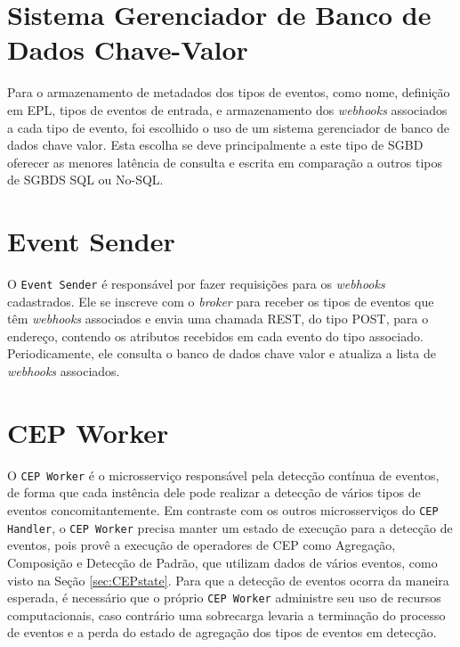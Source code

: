\section{Sistema Gerenciador de Banco de Dados Chave-Valor}
\label{sec:key-value-sgbd}
Para o armazenamento de metadados dos tipos de eventos, como nome, definição em EPL, tipos de eventos de entrada, e armazenamento dos \textit{webhooks} associados a cada tipo de evento, foi escolhido o uso de um sistema gerenciador de banco de dados chave valor. Esta escolha se deve principalmente a este tipo de SGBD oferecer as menores latência de consulta e escrita em comparação a outros tipos de SGBDS SQL ou No-SQL. 

\section{Event Sender} \label{sec:eventsender}

O \texttt{Event Sender} é responsável por fazer requisições para os \textit{webhooks} cadastrados. 
Ele se inscreve com o \textit{broker}%
para receber os tipos de eventos que têm \textit{webhooks} associados e envia uma chamada REST, do tipo POST, para o endereço, contendo os atributos recebidos em cada evento do tipo associado. Periodicamente, ele consulta o banco de dados chave valor e atualiza a lista de \textit{webhooks} associados.

\section{CEP Worker} \label{sec:cepworker}

O \texttt{CEP Worker} é o microsserviço responsável pela detecção contínua de eventos, de forma que cada instência dele pode realizar a detecção de vários tipos de eventos concomitantemente.
Em contraste com os outros microsserviços do \texttt{CEP Handler}, o \texttt{CEP Worker} precisa manter um estado de execução para a detecção de eventos, pois provê a execução de operadores de CEP como Agregação, Composição e Detecção de Padrão, que utilizam dados de vários eventos, como visto na Seção \ref{sec:CEPstate}. Para que a detecção de eventos ocorra da maneira esperada, é necessário que o próprio \texttt{CEP Worker} administre seu uso de recursos computacionais, caso contrário uma sobrecarga levaria a terminação do processo de eventos e a perda do estado de agregação dos tipos de eventos em detecção.


